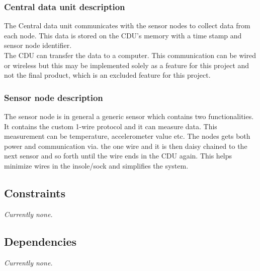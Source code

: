 \subsubsection{Central data unit description}
The Central data unit communicates with the sensor nodes to collect data from each node. This data is stored on the CDU's memory with a time stamp and sensor node identifier.\\
The CDU can transfer the data to a computer. This communication can be wired or wireless but this may be implemented solely as a feature for this project and not the final product, which is an excluded feature for this project.

\subsubsection{Sensor node description}
The sensor node is in general a generic sensor which contains two functionalities. It contains the custom 1-wire protocol and it can measure data. This measurement can be temperature, accelerometer value etc. The nodes gets both power and communication via. the one wire and it is then daisy chained to the next sensor and so forth until the wire ends in the CDU again. This helps minimize wires in the insole/sock and simplifies the system. 

\subsection{Constraints}
\textit{Currently none.}
\subsection{Dependencies}
\textit{Currently none.}



